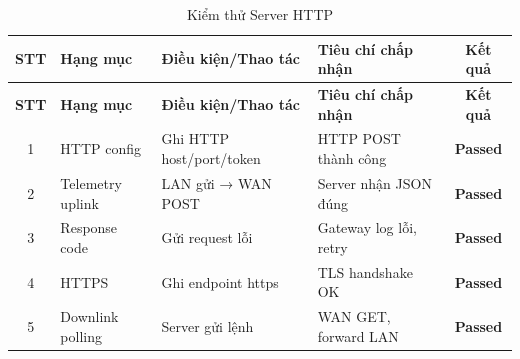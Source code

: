         \begin{longtable}{|c|p{}|p{}|p{}|c|}
            \caption{Kiểm thử Server HTTP}
            \label{tab:test_http} \\
            \hline
            \textbf{STT} & \textbf{Hạng mục} & \textbf{Điều kiện/Thao tác} & \textbf{Tiêu chí chấp nhận} & \textbf{Kết quả} \\ \hline
            \endfirsthead
        
            \hline
            \textbf{STT} & \textbf{Hạng mục} & \textbf{Điều kiện/Thao tác} & \textbf{Tiêu chí chấp nhận} & \textbf{Kết quả} \\ \hline
            \endhead
        
            \hline
            \endfoot
            \endlastfoot
        
            1 & HTTP config & Ghi HTTP host/port/token & HTTP POST thành công & \textcolor{modern_blue}{\textbf{Passed}} \\ \hline
            2 & Telemetry uplink & LAN gửi → WAN POST & Server nhận JSON đúng & \textcolor{modern_blue}{\textbf{Passed}} \\ \hline
            3 & Response code & Gửi request lỗi & Gateway log lỗi, retry & \textcolor{modern_blue}{\textbf{Passed}} \\ \hline
            4 & HTTPS & Ghi endpoint https & TLS handshake OK & \textcolor{modern_blue}{\textbf{Passed}} \\ \hline
            5 & Downlink polling & Server gửi lệnh & WAN GET, forward LAN & \textcolor{modern_blue}{\textbf{Passed}} \\ \hline
        \end{longtable}
        
